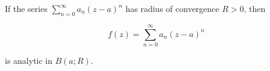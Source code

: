 If the series $\sum_{n=0}^{\infty} a_n(z-a)^n$ has radius of convergence $R > 0$, then

$$f(z) = \sum_{n=0}^{\infty} a_n(z-a)^n$$

is analytic in $B(a; R)$.
